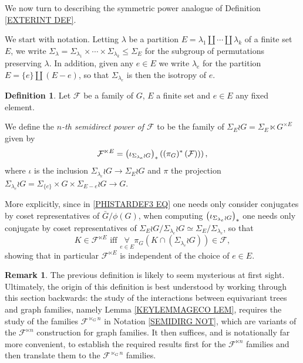 \documentclass[a4paper,10pt
,draft
]{article}%
\numberwithin{equation}{section}
\numberwithin{figure}{section}
\theoremstyle{definition} %
\newtheorem{definition}[equation]{Definition}%
\newtheorem{remark}[equation]{Remark}%
\newcommand{\1}{\ensuremath{\mathbbm 1}}%
\begin{document}
We now turn to describing the symmetric power analogue of 
Definition \ref{EXTERINT DEF}.

We start with notation. Letting 
$\lambda$ be a partition 
$E = \lambda_1 \amalg\cdots \amalg \lambda_k$
of a finite set $E$, 
we write 
 $\Sigma_{\lambda} = \Sigma_{\lambda_1} \times \cdots \times
 \Sigma_{\lambda_k} \leq \Sigma_E$ for the subgroup of permutations preserving $\lambda$. 
 In addition, given any $e \in E$ we write
$\lambda_e$ for the partition $E = \{e\} \amalg (E-e)$, so that $\Sigma_{\lambda_e}$ is then the isotropy of $e$.


\begin{definition}\label{FLTIMESN DEF}
 Let $\mathcal{F}$ be a family of $G$,
 $E$ a finite set and $e \in E$ any fixed element.
 
We define the \textit{$n$-th semidirect power of $\mathcal{F}$} to be the family of $\Sigma_E \wr G = \Sigma_E \ltimes G^{\times E}$ given by
\[
	\mathcal{F}^{\ltimes E}
		=
	\left(
	\iota_{\Sigma_{\lambda_e} \wr G}
	\right)_{\**}
	\left(
		\left(
		\pi_{G})^{\**}\left(\mathcal{F}\right)
		\right)
	\right),
\]
where $\iota$ is the inclusion 
$\Sigma_{\lambda_e} \wr G
	\to 
\Sigma_E \wr G$
and $\pi$ the projection
$\Sigma_{\lambda_e} \wr G = \Sigma_{\{e\}} \times G \times \Sigma_{E-e} \wr G
\to G$.

More explicitly, since in \eqref{PHISTARDEF3 EQ} one needs only consider conjugates by coset representatives of $\bar{G}/\phi(G)$, when computing 
$\left( \iota_{\Sigma_{\lambda_e} \wr G}\right)_{\**}$
one needs only conjugate by coset representatives of 
$\Sigma_E \wr G/\Sigma_{\lambda_e} \wr G \simeq \Sigma_E/\Sigma_{\lambda_e}$, so that
\begin{equation}\label{FLTIMESN2 EQ}
	K \in \mathcal{F}^{\ltimes E} 
	\text{ iff }
	\underset{e \in E}{\forall} \pi_{G}
	\left(
		K \cap \left( \Sigma_{\lambda_e} \wr G \right)
	\right)
	\in \mathcal{F},
\end{equation}
showing that in particular $\mathcal{F}^{\ltimes E}$
is independent of the choice of $e \in E$.
\end{definition}



\begin{remark}
The previous definition is likely to seem mysterious at first sight. Ultimately, the origin of this definition
is best understood by working through this section backwards:
the study of the interactions between equivariant trees and graph families, namely Lemma \ref{KEYLEMMAGECO LEM}, requires the study of the families $\mathcal{F}^{\ltimes_G n}$ in Notation \ref{SEMIDIRG NOT}, which are variants of the $\mathcal{F}^{\ltimes n}$ construction for graph families.
It then suffices, and is notationally far more convenient, to establish the required results first for the $\mathcal{F}^{\ltimes n}$ families and then translate them to the $\mathcal{F}^{\ltimes_G n}$ families.
\end{remark}
\end{document}
